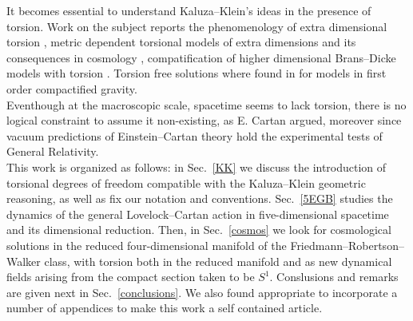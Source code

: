\documentclass[aps,prd,12pt,superscriptaddress,showpacs,showkeys,longbibliography,reprint]{revtex4-1}
\begin{document}
It becomes essential to understand Kaluza--Klein's ideas in the presence of torsion. Work on the subject reports the phenomenology of extra dimensional torsion \cite{Kalinowski:1980da}, metric dependent torsional models of extra dimensions \cite{Shankar:2012vd} and its consequences in cosmology \cite{Chen:2009ep}, compatification of higher dimensional Brans--Dicke models with torsion \cite{German:1993bq}. Torsion free solutions where found in \cite{Aros:2007nn} for models in first order compactified gravity.\\
Eventhough at the macroscopic scale, spacetime seems to lack torsion, there is no logical constraint to assume it non-existing, as E. Cartan argued, moreover since vacuum predictions of Einstein--Cartan theory hold the experimental tests of General Relativity.\\
This work is organized as follows: in Sec.~\ref{KK} we discuss the introduction of torsional degrees of freedom compatible with the Kaluza--Klein geometric reasoning, as well as fix our notation and conventions. Sec.~\ref{5EGB} studies the dynamics of the general Lovelock--Cartan action in five-dimensional spacetime and its dimensional reduction. Then, in Sec.~\ref{cosmos} we look for cosmological solutions in the reduced four-dimensional manifold of the Friedmann--Robertson--Walker class, with torsion both in the reduced manifold and as new dynamical fields arising from the compact section taken to be $S^1$. Conslusions and remarks are given next in Sec.~\ref{conclusions}. We also found appropriate to incorporate a number of appendices to make this work a self contained article.
\end{document}
